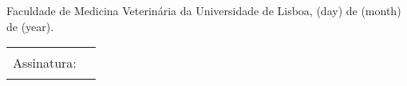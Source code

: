 Faculdade de Medicina Veterinária da Universidade de Lisboa, 
\thedocemxadate(day) de
\thedocemxadate(month) de
\thedocemxadate(year).\par
\vspace*{2ex}
\begin{tabularx}{\linewidth}{@{}lX@{}}
Assinatura: & \rule{\linewidth}{0.75pt}
\end{tabularx}
\vfill
\ntprintacknowledgementsblock
\egroup
